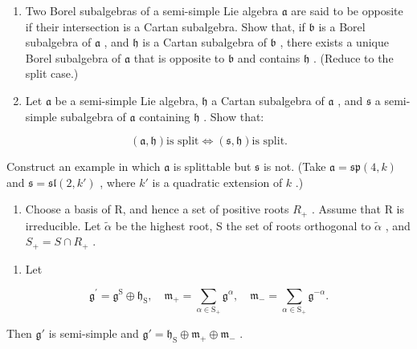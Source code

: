 \begin{enumerate}
\def\labelenumi{\arabic{enumi})}
\setcounter{enumi}{5}
\item
  Two Borel subalgebras of a semi-simple Lie algebra \(\mathfrak{a}\) are said to be opposite if their intersection is a Cartan subalgebra. Show that, if \(\mathfrak{b}\) is a Borel subalgebra of \(\mathfrak{a}\) , and \(\mathfrak{h}\) is a Cartan subalgebra of \(\mathfrak{b}\) , there exists a unique Borel subalgebra of \(\mathfrak{a}\) that is opposite to \(\mathfrak{b}\) and contains \(\mathfrak{h}\) . (Reduce to the split case.)
\item
  Let \(\mathfrak{a}\) be a semi-simple Lie algebra, \(\mathfrak{h}\) a Cartan subalgebra of \(\mathfrak{a}\) , and \(\mathfrak{s}\) a semi-simple subalgebra of \(\mathfrak{a}\) containing \(\mathfrak{h}\) . Show that:
\end{enumerate}

\[
(\mathfrak {a}, \mathfrak {h}) \text {is split} \Longleftrightarrow (\mathfrak {s}, \mathfrak {h}) \text {is split.}
\]

Construct an example in which \(\mathfrak{a}\) is splittable but \(\mathfrak{s}\) is not. (Take \(\mathfrak{a} = \mathfrak{sp}(4, k)\) and \(\mathfrak{s} = \mathfrak{sl}(2, k')\) , where \(k'\) is a quadratic extension of \(k\) .)

\begin{enumerate}
\def\labelenumi{\arabic{enumi})}
\setcounter{enumi}{7}
\tightlist
\item
  Choose a basis of R, and hence a set of positive roots \(R_{+}\) . Assume that R is irreducible. Let \(\tilde{\alpha}\) be the highest root, S the set of roots orthogonal to \(\tilde{\alpha}\) , and \(S_{+} = S \cap R_{+}\) .
\end{enumerate}

\begin{enumerate}
\def\labelenumi{\alph{enumi})}
\tightlist
\item
  Let
\end{enumerate}

\[
\mathfrak {g} ^ {\prime} = \mathfrak {g} ^ {\mathrm{S}} \oplus \mathfrak {h} _ {\mathrm{S}}, \quad \mathfrak {m} _ {+} = \sum_ {\alpha \in \mathrm{S} _ {+}} \mathfrak {g} ^ {\alpha}, \quad \mathfrak {m} _ {-} = \sum_ {\alpha \in \mathrm{S} _ {+}} \mathfrak {g} ^ {- \alpha}.
\]

Then \(\mathfrak{g}'\) is semi-simple and \(\mathfrak{g}' = \mathfrak{h}_{\mathrm{S}} \oplus \mathfrak{m}_{+} \oplus \mathfrak{m}_{-}\) .

